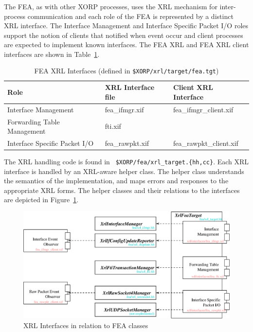 \documentclass[11pt]{article}
\begin{document}
The FEA, as with other XORP processes, uses the XRL mechanism for
inter-process communication and each role of the FEA is represented by
a distinct XRL interface.  The Interface Management and Interface
Specific Packet I/O roles support the notion of clients that notified
when event occur and client processes are expected to implement known
interfaces.  The FEA XRL and FEA XRL client interfaces are shown in
Table~\ref{tbl:xifs}.

\begin{table}[h]
\begin{center}
\begin{tabular}{|l|l|l|}\hline
Role & XRL Interface file & Client XRL Interface\\ \hline\hline
Interface Management 		& fea\_ifmgr.xif	& fea\_ifmgr\_client.xif\\
Forwarding Table Management	& fti.xif 		& \\
Interface Specific Packet I/O	& fea\_rawpkt.xif 	& fea\_rawpkt\_client.xif\\ \hline
\end{tabular}
\caption{FEA XRL Interfaces (defined in {\tt \$XORP/xrl/target/fea.tgt})}
\label{tbl:xifs}
\end{center}
\end{table}

The XRL handling code is found in {\tt
\$XORP/fea/xrl\_target.\{hh,cc\}}.  Each XRL interface is handled by
an XRL-aware helper class.  The helper class understands the semantics
of the implementation, and maps errors and responses to the appropriate
XRL forms.  The helper classes and their relations to the interfaces
are depicted in Figure~\ref{fig:xrl_ifs}.

\clearpage
\begin{figure}[htbp]
  \begin{center}
    \includegraphics[angle=90,height=0.90\textheight]{figs/xrl_ifs}
    \caption{XRL Interfaces in relation to FEA classes}
    \label{fig:xrl_ifs}
  \end{center}
\end{figure}
\clearpage
\end{document}
